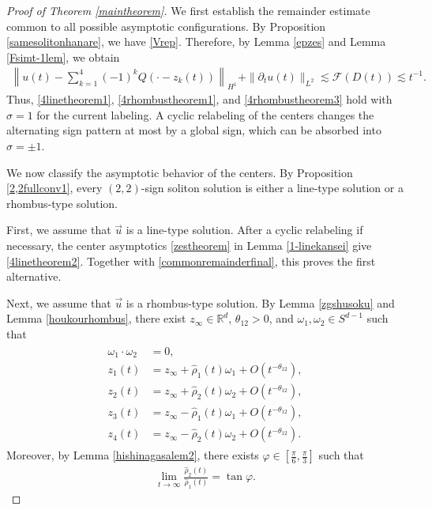 \documentclass[10pt,a4paper]{amsart}
\numberwithin{equation}{section}
\begin{document}
\begin{proof}[Proof of Theorem \ref{maintheorem}]

We first establish the remainder estimate common to all possible asymptotic configurations. By Proposition \ref{samesolitonhanare}, we have \eqref{Vrep}. Therefore, by Lemma \ref{epzes} and Lemma \ref{Fsimt-1lem}, we obtain
\begin{align}\label{commonremainderfinal}
\left\|u(t)-\sum_{k=1}^4(-1)^kQ(\cdot-z_k(t))\right\|_{H^1}+\|{\partial}_tu(t)\|_{L^2}\lesssim \mathcal{F}(D(t)) \lesssim t^{-1}.
\end{align}
Thus, \eqref{4linetheorem1}, \eqref{4rhombustheorem1}, and \eqref{4rhombustheorem3} hold with $\sigma=1$ for the current labeling. A cyclic relabeling of the centers changes the alternating sign pattern at most by a global sign, which can be absorbed into $\sigma=\pm1$.

We now classify the asymptotic behavior of the centers. By Proposition \ref{2,2fullconv1}, every $(2,2)$-sign soliton solution is either a line-type solution or a rhombus-type solution.

First, we assume that $\vec{u}$ is a line-type solution. After a cyclic relabeling if necessary, the center asymptotics \eqref{zestheorem} in Lemma \ref{1-linekansei} give \eqref{4linetheorem2}. Together with \eqref{commonremainderfinal}, this proves the first alternative.

Next, we assume that $\vec{u}$ is a rhombus-type solution. By Lemma \ref{zgshusoku} and Lemma \ref{houkourhombus}, there exist $z_{\infty}\in\mathbb{R}^d$, $\theta_{12}>0$, and $\omega_1,\omega_2\in S^{d-1}$ such that
\begin{align}\label{rhombusdirectionfinal}
\begin{aligned}
\omega_1\cdot\omega_2&=0,
\\
z_1(t)&=z_{\infty}+\hat{\rho}_1(t)\omega_1+O\left(t^{-\theta_{12}}\right),
\\
z_2(t)&=z_{\infty}+\hat{\rho}_2(t)\omega_2+O\left(t^{-\theta_{12}}\right),
\\
z_3(t)&=z_{\infty}-\hat{\rho}_1(t)\omega_1+O\left(t^{-\theta_{12}}\right),
\\
z_4(t)&=z_{\infty}-\hat{\rho}_2(t)\omega_2+O\left(t^{-\theta_{12}}\right).
\end{aligned}
\end{align}
Moreover, by Lemma \ref{hishinagasalem2}, there exists $\varphi\in\left[\frac{\pi}{6},\frac{\pi}{3}\right]$ such that
\begin{align*}
\lim_{t\to\infty}\frac{\hat{\rho}_2(t)}{\hat{\rho}_1(t)}=\tan\varphi.
\end{align*}


\end{proof}
\end{document}
